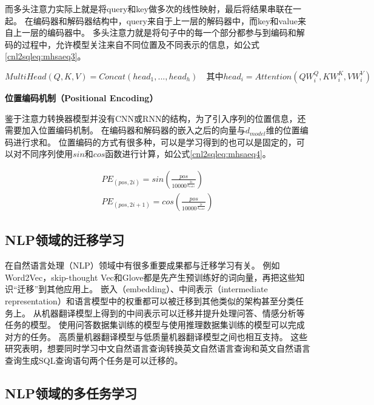 而多头注意力实际上就是将query和key做多次的线性映射，最后将结果串联在一起。
在编码器和解码器结构中，query来自于上一层的解码器中，而key和value来自上一层的编码器中。
多头注意力就是将句子中的每一个部分都参与到编码和解码的过程中，允许模型关注来自不同位置及不同表示的信息，如公式\ref{cnl2sqleq:mhsaeq3}。

\begin{equation}
  \label{cnl2sqleq:mhsaeq3}
  MultiHead(Q,K,V) = Concat(head_1,...,head_h) \quad \mbox{其中} head_i = Attention(QW^Q_i,KW^K_i,VW^V_i)
\end{equation}

\textbf{位置编码机制（Positional Encoding）}

鉴于注意力转换器模型并没有CNN或RNN的结构，为了引入序列的位置信息，还需要加入位置编码机制。
在编码器和解码器的嵌入之后的向量与$d_{model}$维的位置编码进行求和。
位置编码的方式有很多种，可以是学习得到的也可以是固定的，可以对不同序列使用$sin$和$cos$函数进行计算，如公式\ref{cnl2sqleq:mhsaeq4}。

\begin{gather}
  \label{cnl2sqleq:mhsaeq4}
  PE_{(pos,2i)} = sin(\frac{pos}{10000^{\frac{2i}{d_{model}}}})\\
  PE_{(pos,2i+1)} = cos(\frac{pos}{10000^{\frac{2i}{d_{model}}}}) 
\end{gather}

\subsection{NLP领域的迁移学习}

在自然语言处理（NLP）领域中有很多重要成果都与迁移学习有关。
例如Word2Vec\cite{mikolov2013efficient}，skip-thought Vec\cite{kiros2015skip}和Glove\cite{pennington2014glove}都是先产生预训练好的词向量，再把这些知识“迁移”到其他应用上。
嵌入（embedding）\cite{collobert2008unified,collobert2011natural}、中间表示（intermediate representation）\cite{peters2018deep}和语言模型中的权重\cite{ramachandran2017unsupervised}都可以被迁移到其他类似的架构甚至分类任务\cite{howard2018fine}上。
从机器翻译模型上得到的中间表示可以迁移并提升处理问答、情感分析等任务的模型\cite{mccann2017learned}。
使用问答数据集训练的模型与使用推理数据集训练的模型可以完成对方的任务\cite{min2017question}。
高质量机器翻译模型与低质量机器翻译模型之间也相互支持\cite{zoph2016transfer}。
这些研究表明，想要同时学习中文自然语言查询转换英文自然语言查询和英文自然语言查询生成SQL查询语句两个任务是可以迁移的。

\subsection{NLP领域的多任务学习}

